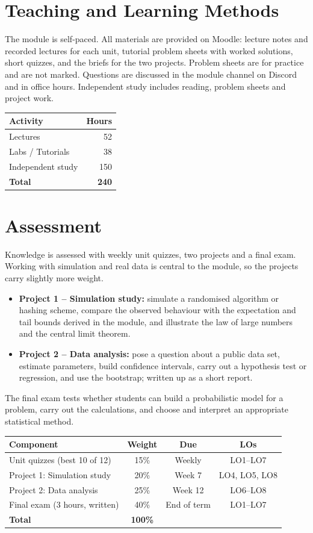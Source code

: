 \documentclass[11pt,a4paper]{article}
\begin{document}
\section{Teaching and Learning Methods}
The module is self-paced. All materials are provided on Moodle: lecture notes and
recorded lectures for each unit, tutorial problem sheets with worked solutions,
short quizzes, and the briefs for the two projects. Problem sheets are for practice
and are not marked. Questions are discussed in the module channel on Discord and in
office hours. Independent study includes reading, problem sheets and project work.

\begin{tabularx}{0.6\textwidth}{X r}
\toprule
\textbf{Activity} & \textbf{Hours} \\
\midrule
Lectures            & 52 \\
Labs / Tutorials    & 38 \\
Independent study   & 150 \\
\midrule
\textbf{Total}      & \textbf{240} \\
\bottomrule
\end{tabularx}

\section{Assessment}
Knowledge is assessed with weekly unit quizzes, two projects and a final
exam. Working with simulation and real data is central to the module, so the
projects carry slightly more weight.
\begin{itemize}
  \item \textbf{Project 1 -- Simulation study:} simulate a randomised algorithm or
        hashing scheme, compare the observed behaviour with the expectation and tail
        bounds derived in the module, and illustrate the law of large numbers and
        the central limit theorem.
  \item \textbf{Project 2 -- Data analysis:} pose a question about a public data
        set, estimate parameters, build confidence intervals, carry out a hypothesis
        test or regression, and use the bootstrap; written up as a short report.
\end{itemize}
The final exam tests whether students can build a probabilistic model for a
problem, carry out the calculations, and choose and interpret an appropriate
statistical method.

\begin{tabularx}{\textwidth}{X c c c}
\toprule
\textbf{Component} & \textbf{Weight} & \textbf{Due} & \textbf{LOs} \\
\midrule
Unit quizzes (best 10 of 12) & 15\% & Weekly & LO1--LO7 \\
Project 1: Simulation study & 20\% & Week 7 & LO4, LO5, LO8 \\
Project 2: Data analysis & 25\% & Week 12 & LO6--LO8 \\
Final exam (3 hours, written) & 40\% & End of term & LO1--LO7 \\
\midrule
\textbf{Total}      & \textbf{100\%} & & \\
\bottomrule
\end{tabularx}
\end{document}
